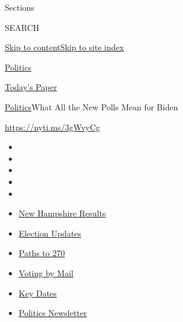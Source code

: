 Sections

SEARCH

\protect\hyperlink{site-content}{Skip to
content}\protect\hyperlink{site-index}{Skip to site index}

\href{https://www.nytimes3xbfgragh.onion/section/politics}{Politics}

\href{https://myaccount.nytimes3xbfgragh.onion/auth/login?response_type=cookie\&client_id=vi}{}

\href{https://www.nytimes3xbfgragh.onion/section/todayspaper}{Today's
Paper}

\href{/section/politics}{Politics}\textbar{}What All the New Polls Mean
for Biden

\url{https://nyti.ms/3gWvyCg}

\begin{itemize}
\item
\item
\item
\item
\item
\end{itemize}

\begin{itemize}
\item
  \href{https://www.nytimes3xbfgragh.onion/interactive/2020/09/08/us/elections/results-new-hampshire-primary-elections.html?action=click\&pgtype=Article\&state=default\&region=TOP_BANNER\&context=storylines_menu}{New
  Hampshire Results}
\item
  \href{https://www.nytimes3xbfgragh.onion/live/2020/09/08/us/trump-vs-biden?action=click\&pgtype=Article\&state=default\&region=TOP_BANNER\&context=storylines_menu}{Election
  Updates}
\item
  \href{https://www.nytimes3xbfgragh.onion/interactive/2020/us/elections/election-states-biden-trump.html?action=click\&pgtype=Article\&state=default\&region=TOP_BANNER\&context=storylines_menu}{Paths
  to 270}
\item
  \href{https://www.nytimes3xbfgragh.onion/interactive/2020/08/31/us/politics/vote-by-mail-deadlines.html?action=click\&pgtype=Article\&state=default\&region=TOP_BANNER\&context=storylines_menu}{Voting
  by Mail}
\item
  \href{https://www.nytimes3xbfgragh.onion/interactive/2019/us/elections/2020-presidential-election-calendar.html?action=click\&pgtype=Article\&state=default\&region=TOP_BANNER\&context=storylines_menu}{Key
  Dates}
\item
  \href{https://www.nytimes3xbfgragh.onion/newsletters/politics?action=click\&pgtype=Article\&state=default\&region=TOP_BANNER\&context=storylines_menu}{Politics
  Newsletter}
\end{itemize}

